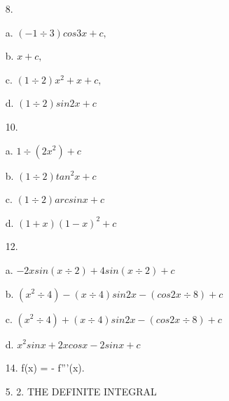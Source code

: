\documentclass{book}
\begin{document}
    \begin{enumerate}
    
        \item[8.]
        \item[a.] 
            $ (-1 \div 3) cos 3x + c, $ 
        \item[b.] $x + c,$
        \item[c.] $ (1 \div 2) x^{2} + x + c,$ 
        \item[d.] $(1 \div 2) sin2x + c$
        
        \item[10.]
        \item[a.] $ 1 \div (2x^{2}) + c $
        \item[b.] $ (1 \div 2) tan^{2} x + c $
        \item[c.] $ (1 \div 2) arcsinx + c $
        \item[d.] $ (1 + x) (1 - x)^{2} + c $
        
        \item[12.]
        \item[a.] $ -2x sin(x \div 2) + 4 sin(x \div 2) + c $ \item[b.] $ (x^{2} \div 4) - (x \div 4) sin2x - (cos2x \div 8) + c $ 
        \item[c.] $ (x^{2} \div 4) + (x \div 4) sin2x - (cos2x \div 8) + c $
        \item[d.]  $ x^{2} sin x + 2xcos x - 2 sin x + c $
        
        \item[14.] f(x) =  - f'''(x). 
        \item[5. 2.] THE DEFINITE INTEGRAL
        

\end{enumerate}
\end{document}
